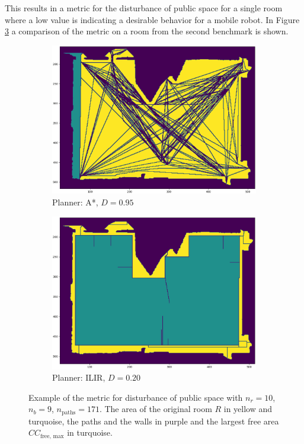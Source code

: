 This results in a metric for the disturbance of public space for a single room where a low value is indicating a desirable behavior for a mobile robot. In Figure \ref{fig:disturbance_example} a comparison of the metric on a room from the second benchmark is shown.

\begin{figure}[h]
    \captionsetup[subfigure]{justification=centering}
    \centering
    \begin{subfigure}{.5\textwidth}
      \centering
      \includegraphics[width=\textwidth]{figures/30_methods/room9_disturbance_astar_smooth.png}
      \caption{Planner: A*, \(D = 0.95\)}
      \label{fig:sub1}
    \end{subfigure}%
    \begin{subfigure}{.5\textwidth}
      \centering
      \includegraphics[width=.975\textwidth]{figures/30_methods/room9_disturbance_ilir_smooth.png}
      \caption{Planner: ILIR, \(D = 0.20\)}
      \label{fig:sub2}
    \end{subfigure}
    \caption[Example of the metric for disturbance of public space]{Example of the metric for disturbance of public space with \(n_r=10\), \(n_b=9\), \(n_{\text{paths}}=171\). The area of the original room \(R\) in yellow and turquoise, the paths and the walls in purple and the largest free area \(CC_{\text{free, max}}\) in turquoise.}
    \label{fig:disturbance_example}
\end{figure}

